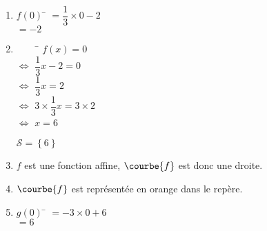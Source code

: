\documentclass[a4paper,11pt,exos]{nsi} %
\begin{document}
    \begin{multicols}{2}
        \begin{enumerate}
            \item 	\begin{tabbing}
                $f(0)$ \=   $=\dfrac{1}{3}\times 0-2$\\[.5em]
                    \>  $=-2$
            \end{tabbing}
            \item 	\begin{tabbing}
                $\qquad$    \=  $f(x)=0$\\
                $\Longleftrightarrow$   \>  $\dfrac{1}{3}x-2=0$\\[.5em]
                $\Longleftrightarrow$   \>  $\dfrac{1}{3}x=2$\\[.5em]
                $\Longleftrightarrow$   \>  $3\times \dfrac{1}{3}x=3\times2$\\
                $\Longleftrightarrow$   \>  $x=6$
            \end{tabbing}
            $\mathcal{S}=\left\{6\right\}$
            \item 	$f$ est une fonction affine, $\courbe{f}$ est donc une droite.
            \item 	 $\courbe{f}$ est représentée en orange dans le repère.
            
            \item	\begin{tabbing}
                $g(0)$ \=   $=-3\times 0+6$\\[.5em]
                    \>  $=6$
            \end{tabbing}
            

\end{enumerate}
\end{multicols}
\end{document}
